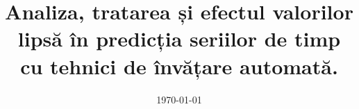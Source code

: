 \documentclass[a4paper, 11pt, oneside]{Thesis}  %
\begin{document}
\frontmatter      %

\title  {Analiza, tratarea și efectul valorilor lipsă în predicția seriilor de timp cu tehnici de învățare automată.}
\addresses  {\groupname\\\deptname\\\univname}  %
\date       {\today}
\subject    {}
\keywords   {}

\maketitle


\pagestyle{fancy}  %


\tableofcontents  %



\mainmatter	  %
\pagestyle{fancy}  %












\end{document}
